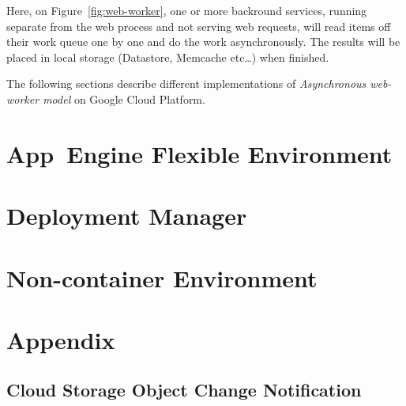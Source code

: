 \documentclass[a4paper]{article}
\begin{document}
Here, on Figure~\ref{fig:web-worker}, one or more backround services, running
separate from the web process and not serving web requests, will read items off their
work queue one by one and do the work asynchronously. The results will be placed in
local storage (Datastore, Memcache etc\ldots) when finished.

The following sections describe different implementations of \emph{Asynchronous
web-worker model} on Google Cloud Platform.

\section{App~Engine Flexible Environment} \blindtext

\section{Deployment Manager} \blindtext

\section{Non-container Environment} \blindtext

\section*{Appendix} \subsection*{Cloud Storage Object Change Notification} \blindtext
\end{document}
